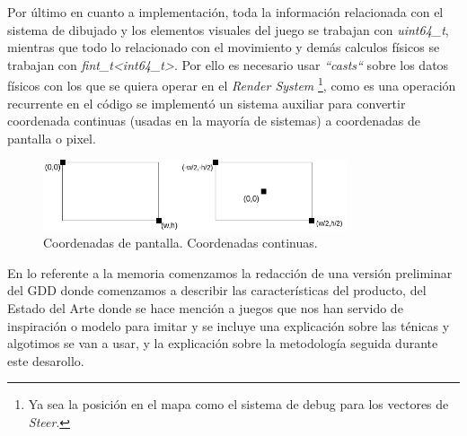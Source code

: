 Por último en cuanto a implementación, toda la información relacionada con el sistema de 
dibujado y los elementos visuales del juego se trabajan con \textit{uint64\_t}, mientras que
todo lo relacionado con el movimiento y demás calculos físicos se trabajan con
\textit{fint\_t\textless int64\_t\textgreater}. Por ello es necesario usar \textit{``casts``}
sobre los datos físicos con los que se quiera operar en el \textit{Render System}
\footnote{Ya sea la posición en el mapa como el sistema de debug para los vectores de
\textit{Steer}.}, como es una operación recurrente en el código se implementó un sistema 
auxiliar para convertir coordenada continuas (usadas en la mayoría de sistemas) a coordenadas de 
pantalla o pixel. 

\begin{figure}[ht]
\centering
\includegraphics[width=0.8\textwidth]{imagenes/diario_desarrollo/sis_coords.png}\\
\hspace{-8mm} Coordenadas de pantalla. \hspace{16mm}  Coordenadas continuas.
\label{fig:sis_coords}
\end{figure} 

En lo referente a la memoria comenzamos la redacción de una versión preliminar del \ac{GDD}
donde comenzamos a describir las características del producto, del Estado del Arte donde se hace
mención a juegos que nos han servido de inspiración o modelo para imitar y se incluye una explicación
sobre las ténicas y algotimos se van a usar, y la explicación sobre la metodología seguida durante
este desarollo. 

\newpage

